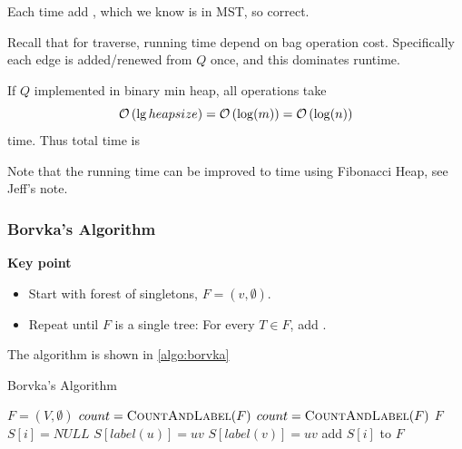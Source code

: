\analysis

Each time add ,
which we know is in MST, so correct.

Recall that for traverse, running time depend on bag operation cost.
Specifically each edge is added/renewed from $Q$ once,
and this dominates runtime.

If $Q$ implemented in binary min heap, all operations take
\[\mathcal{O}\left(\lg{heap size}\right) = \mathcal{O}\left(\log(m)\right) = \mathcal{O}\left(\log(n)\right)\]
time. Thus total time is 

Note that the running time can be improved to
 time using Fibonacci Heap, see Jeff's note.

\subsubsection{Borvka's Algorithm}
\vspace{0.1in}\noindent\textbf{Key point}
\begin{itemize}
    \item Start with forest of singletons, $F = (v,\emptyset)$.
    \item Repeat until $F$ is a single tree:
        For every $T \in F$, add .
\end{itemize}
The algorithm is shown in \cref{algo:borvka}
\begin{algorithm}[H]
    \caption{Borvka's Algorithm}\label{algo:borvka}
    \begin{algorithmic}[1]
            \State $F = (V, \emptyset)$
            \State $count = \textsc{CountAndLabel} (F)$
                \State {}
                \State $count = \textsc{CountAndLabel} (F)$
            \EndWhile
            \Return $F$
        \EndProcedure
        \State
            \State $S[i] = NULL$ 
            \EndFor
                        \State $S[label(u)] = uv$
                    \EndIf
                        \State $S[label(v)] = uv$
                    \EndIf
                \EndIf
            \EndFor
                    \State add $S[i]$ to $F$
                \EndIf
            \EndFor
        \EndProcedure
    \end{algorithmic}
\end{algorithm}

